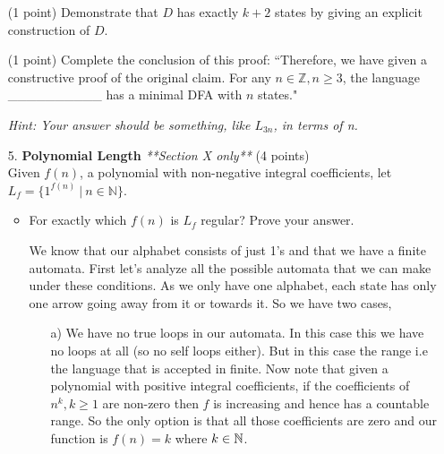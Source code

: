 \documentclass[11pt]{article}
\begin{document}
\begin{enumerate}
    \begin{answer}
    \end{answer}
    
    \newline

    (1 point) Demonstrate that $D$ has exactly $k+2$ states by giving an explicit construction of $D$.
    
    \begin{answer}
    \end{answer}
    
    \newline

    (1 point) Complete the conclusion of this proof: ``Therefore, we have given a constructive proof of the original claim. For any $n \in \mathbb{Z}, n \geq 3$, the language \_\_\_\_\_\_\_\_\_\_ has a minimal DFA with $n$ states."

    \emph{Hint: Your answer should be something, like $L_{3n}$, in terms of n.}
    
    \begin{answer}
    \end{answer}
    
    \newline

    \item [5.] \textbf{Polynomial Length} \textit{**Section X only**} (4 points)\\
    Given $f(n)$, a polynomial with non-negative integral coefficients, let $L_f = \{1^{f(n)} ~|~ n \in \mathbb{N}\}$.
    \begin{itemize}
        \item For exactly which $f(n)$ is $L_f$ regular? Prove your answer. 
        
        \begin{answer}
            We know that our alphabet consists of just 1's and that we have a finite automata. First let’s analyze all the possible automata that we can make under these conditions. As we only have one alphabet, each state has only one arrow going away from it or towards it. So we have two cases,

\begin{enumerate}
    \item[a)] We have no true loops in our automata. In this case this we have no loops at all (so no self loops either). But in this case the range i.e the language that is accepted in finite. Now note that given a polynomial with positive integral coefficients, if the coefficients of $n^{k}, k \ge 1$  are non-zero then $f$ is increasing and hence has a countable range. So the only option is that all those coefficients are zero and our function is $f(n) = k$ where $k \in \mathbb{N}$.
    

\end{enumerate}
\end{answer}
\end{itemize}
\end{enumerate}
\end{document}

